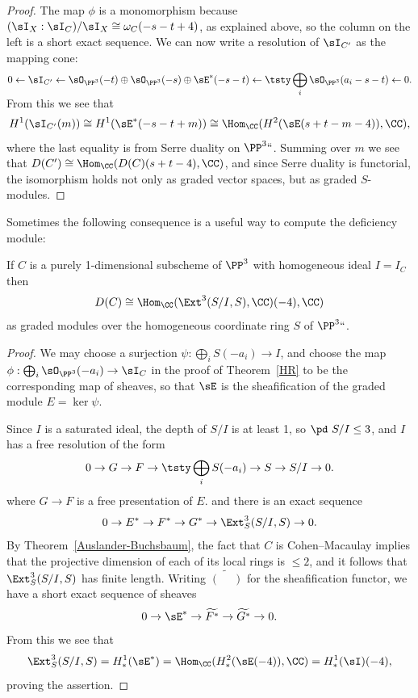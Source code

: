 \begin{proof}
The map $\phi$ is a monomorphism because $(\sI_X:\sI_C)/\sI_X \cong
\omega_C(-s-t+4)$, as explained above, so the column on the left is a
short exact sequence.
We can now write a resolution of $\sI_{C'}$ as the mapping cone:
$$
0\leftarrow \sI_{C'} \leftarrow \sO_{\PP^3}(-t)\oplus \sO_{\PP^3}(-s)
\oplus \sE^*(-s-t) \leftarrow
\smash[b]{\tsty\bigoplus\limits_i\sO_{\PP^3}(a_i-s-t)}\leftarrow 0.
$$
From this we see that
$$
H^1(\sI_{C'}(m)) \cong H^1(\sE^*(-s-t+m)) \cong \Hom_\CC(
H^2(\sE(s+t-m-4)), \CC)
,
$$
where the last equality is from
Serre duality
on $\PP^3` `$. Summing
%
over $m$ we see that
$D(C') \cong \Hom_\CC(D(C)(s+t-4), \CC)$,
and since Serre duality is functorial, the isomorphism holds not only
as graded vector spaces, but as graded $S$-modules.
\end{proof}

Sometimes the following consequence is a useful way to compute the
deficiency module:

\begin{proposition}\label{deficiency as dual of Ext}
If $C$ is a purely 1-dimensional subscheme of $\PP^3$ with homogeneous
ideal $I = I_C$ then
$$
D(C) \cong \Hom_\CC (\Ext^3(S/I, S), \CC)(-4), \CC)
$$
as graded modules over the homogeneous coordinate ring $S$ of $\PP^3` `$.
\unif
\end{proposition}

\begin{proof}
We may choose a surjection $\psi: \bigoplus_iS(-a_i)\to I$, and choose
the map
$\phi: \bigoplus_i\sO_{\PP^3}(-a_i)\to\sI_C$
in the proof of Theorem~\ref{HR}
to be the corresponding map of sheaves, so that
$\sE$ is the sheafification of the graded module $E = \ker \psi$.

Since $I$ is a saturated ideal,
the depth of $S/I$ is at least 1, so $\pd\ S/I\leq 3$, and $I$ has a
free resolution of the form
$$
0\to G \to F \to \tsty\bigoplus\limits_iS(-a_i) \to S\to S/I \to 0.
$$
where $G\to F$ is a free presentation of $E$. and there is an exact
sequence
$$
0 \to E^* \to F^* \to G^* \to \Ext^3_S(S/I, S) \to 0.
$$
By Theorem~\ref{Auslander-Buchsbaum}, the fact that $C$ is Cohen--Macaulay
implies that the projective dimension of each of its
local rings is $\leq 2$, and it follows that
$\Ext^3_S(S/I, S)$ has finite length. Writing $\widetilde{(\phantom{-})}$
for the sheafification functor,
we have a short exact sequence of sheaves
$$
0\to \sE^* \to \widetilde{F^*} \to \widetilde{G^*}\to 0.
$$
From this we see that
$$
\Ext^3_S(S/I,S) = H^1_*(\sE^*) = \Hom_\CC( H^2_*(\sE(-4)),\CC) =
H^1_*(\sI)(-4),
$$
proving the assertion.
\end{proof}

